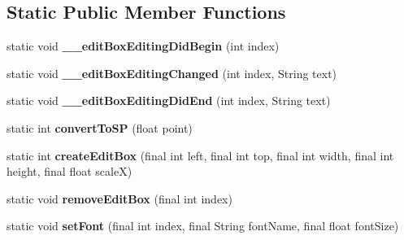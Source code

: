 \subsection*{Static Public Member Functions}
\begin{DoxyCompactItemize}
\item 
\mbox{\label{classorg_1_1cocos2dx_1_1lib_1_1Cocos2dxEditBoxHelper_a7db2b970ddef9fe0ff4f4c417e6094c6}} 
static void {\bfseries \+\_\+\+\_\+edit\+Box\+Editing\+Did\+Begin} (int index)
\item 
\mbox{\label{classorg_1_1cocos2dx_1_1lib_1_1Cocos2dxEditBoxHelper_afba63f780a4c3e7e39c62e64b1b6aaa2}} 
static void {\bfseries \+\_\+\+\_\+edit\+Box\+Editing\+Changed} (int index, String text)
\item 
\mbox{\label{classorg_1_1cocos2dx_1_1lib_1_1Cocos2dxEditBoxHelper_ac3faaf3a3f27bb1dd48b832876a7c028}} 
static void {\bfseries \+\_\+\+\_\+edit\+Box\+Editing\+Did\+End} (int index, String text)
\item 
\mbox{\label{classorg_1_1cocos2dx_1_1lib_1_1Cocos2dxEditBoxHelper_a4a5d7a04bafdf3d0ddb32e6c12452721}} 
static int {\bfseries convert\+To\+SP} (float point)
\item 
\mbox{\label{classorg_1_1cocos2dx_1_1lib_1_1Cocos2dxEditBoxHelper_a649309f38c0470ba193fb965cf4df12c}} 
static int {\bfseries create\+Edit\+Box} (final int left, final int top, final int width, final int height, final float scaleX)
\item 
\mbox{\label{classorg_1_1cocos2dx_1_1lib_1_1Cocos2dxEditBoxHelper_af15fe7a70c16b0c45715b4926fdcc586}} 
static void {\bfseries remove\+Edit\+Box} (final int index)
\item 
\mbox{\label{classorg_1_1cocos2dx_1_1lib_1_1Cocos2dxEditBoxHelper_ac91997ad80ca9bbda19fd11b6c2c4add}} 
static void {\bfseries set\+Font} (final int index, final String font\+Name, final float font\+Size)

\end{DoxyCompactItemize}
